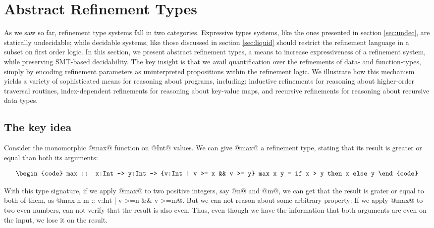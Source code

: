 \section{Abstract Refinement Types}\label{sec:abstract}

As we saw so far, refinement type systems fall in two categories.
Expressive types systems, like the ones presented in section \ref{sec:undec}, 
are statically undecidable; while decidable systems, like those discussed in section \ref{sec:liquid} 
should restrict the refinement language in a subset on first order logic.
%
In this section, we present abstract refinement types\cite{Vazou13},
a means to increase expressiveness of a refinement system,
while preserving SMT-based decidability.
%
The key insight is that we avail 
quantification over
the refinements of data- and function-types,
simply by encoding
refinement parameters as uninterpreted propositions within the refinement logic.
We illustrate how this mechanism yields a variety of sophisticated means for
reasoning about programs, including: 
inductive refinements for reasoning about higher-order traversal routines,
index-dependent refinements for reasoning about key-value maps, and
recursive refinements for reasoning about recursive data types.

\subsection{The key idea}
Consider the monomorphic @max@ function on @Int@ values.
We can give @max@ a refinement type, stating that its result
is greater or equal than both its arguments:
  
$$\centering\begin{tabular}{c}
\begin{code}
max     :: x:Int -> y:Int -> {v:Int | v >= x && v >= y}
max x y = if x > y then x else y
\end{code}
\end{tabular}$$

With this type signature, if we apply @max@ to two positive integers, 
say @n@ and @m@, we can get that the result is grater or equal to both 
of them, as @max n m :: {v:Int | v >=n && v >=m}@.
But we can not reason about some arbitrary property: 
If we apply @max@ to two even numbers, can not verify that the result is 
also even.
%
Thus, even though we have the information that both arguments are even on the input, 
we lose it on the result.

